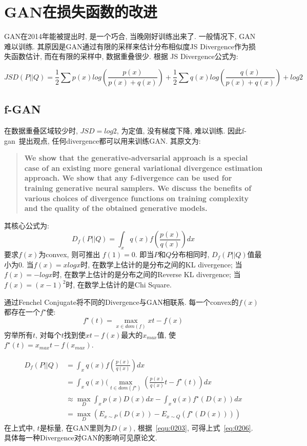 \section{GAN在损失函数的改进}
GAN在2014年能被提出时, 是一个巧合, 当晚刚好训练出来了. 一般情况下, GAN难以训练. 其原因是GAN通过有限的采样来估计分布相似度JS Divergence作为损失函数估计, 而在有限的采样中, 数据重叠很少. 根据 JS Divergence公式为: 

\begin{equation}
    JSD(P||Q)=\frac{1}{2}\sum p(x)log(\frac{p(x)}{p(x)+q(x)}) + \frac{1}{2}\sum q(x)log(\frac{q(x)}{p(x)+q(x)}) + log2
\end{equation}

\subsection{f-GAN}
在数据重叠区域较少时, $JSD=log2$, 为定值, 没有梯度下降, 难以训练. 因此f-gan~\cite{f-gan}提出观点, 任何divergence都可以用来训练GAN. 其原文为:

\begin{quotation}
    \bfseries
    We show that the generative-adversarial approach is a special case of an existing more general variational divergence estimation approach. We show that any f-divergence can be used for training generative neural samplers. We discuss the benefits of various choices of divergence functions on training complexity and the quality of the obtained generative models.
\end{quotation}

其核心公式为: 
\begin{equation}
    D_{f}(P||Q)=\int_{x} q(x)f(\frac{p(x)}{q(x)}) dx
\end{equation}
要求$f(x)$为convex, 则可推出 $f(1)=0$. 即当$P$和$Q$分布相同时, $D_{f}(P||Q)$值最小为$0$. 当$f(x)=xlogx$时, 在数学上估计的是分布之间的KL divergence; 当$f(x)=-logx$时, 在数学上估计的是分布之间的Reverse KL divergence; 当$f(x)=(x-1)^{2}$时, 在数学上估计的是Chi Square. 

通过Fenchel Conjugate将不同的Divergence与GAN相联系. 每一个convex的$f(x)$都存在一个$f^{\star}$使:
\begin{equation}
    f^{\star}(t) = \max \limits_{x\in dom(f)} {xt-f(x)}
    \label{equ:0203}
\end{equation}
穷举所有$t$, 对每个$t$找到使$xt-f(x)$最大的$x_{max}$值, 使$f^{\star}(t) = x_{max}t-f(x_{max})$. 

\begin{align}
    D_{f}(P||Q) & = \int_{x}q(x)f(\frac{p(x)}{q(x)}) dx \\
    & = \int_{x}q(x)(\max \limits_{t\in dom(f^{\star})} (\frac{p(x)}{q(x)}t-f^{\star}(t)) dx  \\
    & \approx \max \limits_{D} \int_{x} p(x)D(x) dx - \int_{x} q(x)f^{\star}(D(x)) dx \label{eq:0206} \\
    & = \max \limits_{D}(E_{x\sim P}(D(x))-E_{x\sim Q}(f^{\star}(D(x))))
\end{align}
在上式中, $t$是标量, 在GAN里则为$D(x)$, 根据~\ref{equ:0203}, 可得上式~\ref{eq:0206}. 具体每一种Divergence对GAN的影响可见原论文. 

